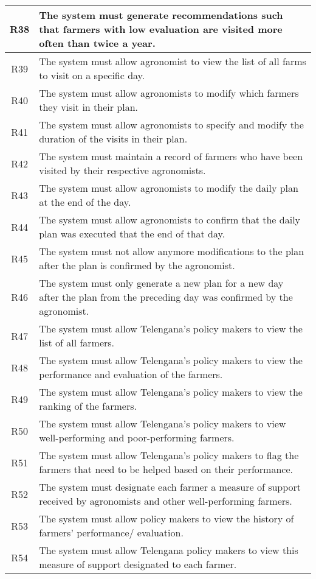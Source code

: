 \begin{center}
\begin{longtable}{|c|>{\raggedright\arraybackslash}m{15cm}|}
R38	& The system must generate recommendations such that farmers with low evaluation are visited more often than twice a year.\\\hline
R39	& The system must allow agronomist to view the list of all farms to visit on a specific day.\\\hline
R40	& The system must allow agronomists to modify which farmers they visit in their plan.\\\hline
R41	& The system must allow agronomists to specify and modify the duration of the visits in their plan.\\\hline
R42	& The system must maintain a record of farmers who have been visited by their respective agronomists.\\\hline
R43	& The system must allow agronomists to modify the daily plan at the end of the day.\\\hline
R44	& The system must allow agronomists to confirm that the daily plan was executed that the end of that day.\\\hline
R45	& The system must not allow anymore modifications to the plan after the plan is confirmed by the agronomist.\\\hline
R46	& The system must only generate a new plan for a new day after the plan from the preceding day was confirmed by the agronomist.\\\hline
R47	& The system must allow Telengana’s policy makers to view the list of all farmers.\\\hline
R48	& The system must allow Telengana’s policy makers to view the performance and evaluation of the farmers.\\\hline
R49	& The system must allow Telengana’s policy makers to view the ranking of the farmers.\\\hline
R50	& The system must allow Telengana’s policy makers to view well-performing and poor-performing farmers.\\\hline
R51	& The system must allow Telengana’s policy makers to flag the farmers that need to be helped based on their performance.\\\hline
R52	& The system must designate each farmer a measure of support received by agronomists and other well-performing farmers.\\\hline
R53	& The system must allow policy makers to view the history of farmers’ performance/ evaluation.\\\hline
R54	& The system must allow Telengana policy makers to view this measure of support designated to each farmer.\\\hline
\end{longtable}
\end{center}

